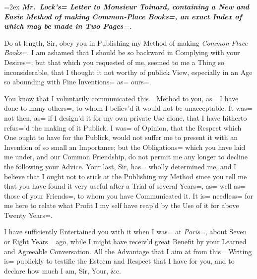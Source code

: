 \clearpage
\newpage
\setcounter{page}{2}
\renewcommand\thepage{\arabic{page}}
\fancyhead{}
\fancyhead[C]{\large(\thepage)}

\hangindent=2ex
{
    \itshape
    \bfseries
    \noindent
    Mr.\ \emph{Lock}'s= Letter to \emph{Monsieur Toinard},
    containing a New and Easie Method of making \emph{Common-Place Books=},
    an exact Index of which may be made in Two Pages=.
}

\settoheight{\dropcapheight}{\usebox{\dropcap}}
\settowidth{\dropcapwidth}{\usebox{\dropcap}}
\smash{\raisebox%
    {-\dimexpr \dropcapheight+0.6\thefontsize\relax}%
    {\noindent\usebox{\dropcap}}}%

\setlength{\shapeindent}{\dimexpr \dropcapwidth+1em\relax}
\setlength{\shapelength}{\textwidth}
\addtolength{\shapelength}{-\shapeindent}
\shapeindent \shapelength
\shapeindent \shapelength
0pt \textwidth
\noindent
\begin{linenumbers}
    Do at length, Sir, obey you in Publishing my Method of making \emph{Common-Place Books=}.
    I am ashamed that I should be so backward in Complying with your Desires=;
    but that which you requested of me,
    seemed to me a Thing so inconsiderable,
    that I thought it not worthy of publick View,
    especially in an Age so abounding with Fine Inventions= as= ours=.

    You know that I voluntarily communicated this= Method to you,
    as= I have done to many others=,
    to whom I believ'd it would not be unacceptable.
    It was= not then,
    as= if I design'd it for my own private Use alone,
    that I have hitherto refus='d the making of it Publick.
    I was= of Opinion, that the Respect which One ought to have for the Publick,
    would not suffer me to present it with an Invention of so small an Importance;
    but the Obligations= which you have laid me under,
    and our Common Friendship,
    do not permit me any longer to decline the following your Advice.
    Your last, Sir, has= wholly determined me,
    and I believe that I ought not to stick at the Publishing my Method since you tell me that you have found it very useful after a Trial of several Years=,
    as= well as= those of your Friends=,
    to whom you have Communicated it.
    It is= needless= for me here to relate what Profit I my self have reap'd by the Use of it for above Twenty Years=.

    I have sufficiently Entertained you with it when I was= at \emph{Paris=},
    about Seven or Eight Years= ago,
    while I might have receiv'd great Benefit by your Learned and Agreeable Conversation.
    All the Advantage that I aim at from this= Writing is= publickly to testifie the Esteem and Respect that I have for you,
    and to declare how much I am, Sir, Your, \&c.
\end{linenumbers}

